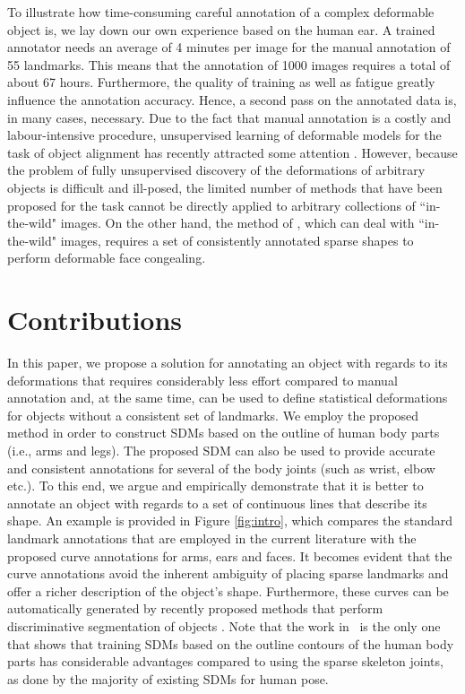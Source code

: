 To illustrate how time-consuming careful annotation of a complex deformable object is, we lay down our own experience based on the human ear. A trained annotator needs an average of 4 minutes per image for the manual annotation of 55 landmarks. This means that the annotation of 1000 images requires a total of about 67 hours. Furthermore, the quality of training as well as fatigue greatly influence the annotation accuracy. Hence, a second pass on the annotated data is, in many cases, necessary. Due to the fact that manual annotation is a costly and labour-intensive procedure, unsupervised learning of deformable models for the task of object alignment has recently attracted some attention \cite{frey2003learning, baker2004automatic, cootes2004groupwise, jojic2006escaping, Huang2006, kokkinos2007unsupervised, jiang2009learning, liu2009simultaneous, Zhang2012}. However, because the problem of fully unsupervised discovery of the deformations of arbitrary objects is difficult and ill-posed, the limited number of methods that have been proposed for the task cannot be directly applied to arbitrary collections of ``in-the-wild" images. On the other hand, the method of \cite{antonakos2014automatic}, which can deal with ``in-the-wild" images, requires a set of consistently annotated sparse shapes to perform deformable face congealing.


\section{Contributions}

In this paper, we propose a solution for annotating an object with regards to its deformations that requires considerably less effort compared to manual annotation and, at the same time, can be used to define statistical deformations for objects without a consistent set of landmarks. We employ the proposed method in order to construct SDMs based on the outline of human body parts (i.e., arms and legs). The proposed SDM can also be used to provide accurate and consistent annotations for several of the body joints (such as wrist, elbow etc.).
To this end, we argue and empirically demonstrate that it is better to annotate an object with regards to a set of continuous lines that describe its shape. An example is provided in Figure \ref{fig:intro}, which compares the standard landmark annotations that are employed in the current literature with the proposed curve annotations for arms, ears and faces. It becomes evident that the curve annotations avoid the inherent ambiguity of placing sparse landmarks and offer a richer description of the object's shape.
%
Furthermore, these curves can be automatically generated by recently proposed methods that perform discriminative segmentation of objects \cite{luo2013pedestrian,liu2015matching}.
%
Note that the work in~\cite{zuffi2012pictorial} is the only one that shows that training SDMs based on the outline contours of the human body parts has considerable advantages compared to using the sparse skeleton joints, as done by the majority of existing SDMs for human pose.

